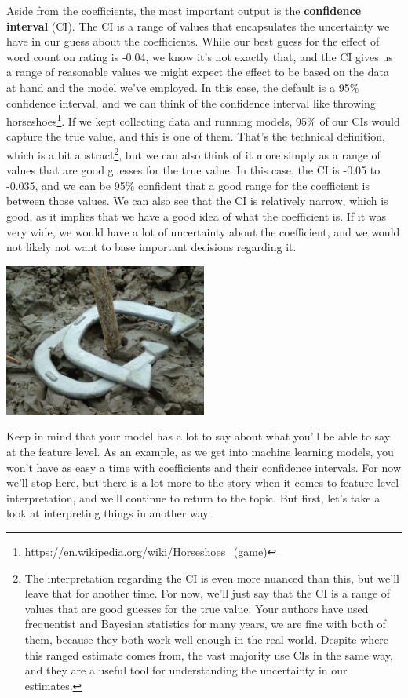 \documentclass[
  letterpaper,
]{krantz}
\DeclareRobustCommand{\href}[2]{#2\footnote{\url{#1}}}
\begin{document}
Aside from the coefficients, the most important output is the
\textbf{confidence interval} (CI). The CI is a range of values that
encapsulates the uncertainty we have in our guess about the
coefficients. While our best guess for the effect of word count on
rating is -0.04, we know it's not exactly that, and the CI gives us a
range of reasonable values we might expect the effect to be based on the
data at hand and the model we've employed. In this case, the default is
a 95\% confidence interval, and we can think of the confidence interval
like \href{https://en.wikipedia.org/wiki/Horseshoes_(game)}{throwing
horseshoes}. If we kept collecting data and running models, 95\% of our
CIs would capture the true value, and this is one of them. That's the
technical definition, which is a bit abstract\footnote{The
  interpretation regarding the CI is even more nuanced than this, but
  we'll leave that for another time. For now, we'll just say that the CI
  is a range of values that are good guesses for the true value. Your
  authors have used frequentist and Bayesian statistics for many years,
  we are fine with both of them, because they both work well enough in
  the real world. Despite where this ranged estimate comes from, the
  vast majority use CIs in the same way, and they are a useful tool for
  understanding the uncertainty in our estimates.}, but we can also
think of it more simply as a range of values that are good guesses for
the true value. In this case, the CI is -0.05 to -0.035, and we can be
95\% confident that a good range for the coefficient is between those
values. We can also see that the CI is relatively narrow, which is good,
as it implies that we have a good idea of what the coefficient is. If it
was very wide, we would have a lot of uncertainty about the coefficient,
and we would not likely not want to base important decisions regarding
it.

\includegraphics[width=0.5\textwidth,height=\textheight]{img/horseshoes.jpeg}

Keep in mind that your model has a lot to say about what you'll be able
to say at the feature level. As an example, as we get into machine
learning models, you won't have as easy a time with coefficients and
their confidence intervals. For now we'll stop here, but there is a lot
more to the story when it comes to feature level interpretation, and
we'll continue to return to the topic. But first, let's take a look at
interpreting things in another way.
\end{document}
